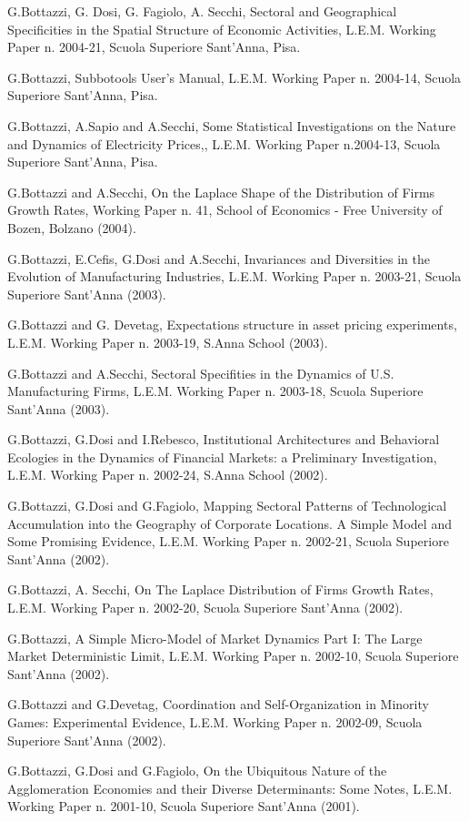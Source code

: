 \documentclass[a4paper]{article}
\begin{document}
G.Bottazzi, G. Dosi, G. Fagiolo, A. Secchi, Sectoral and Geographical
Specificities in the Spatial Structure of Economic Activities,
L.E.M. Working Paper n. 2004-21, Scuola Superiore Sant'Anna, Pisa.

G.Bottazzi, Subbotools User's Manual, L.E.M. Working Paper n.
2004-14, Scuola Superiore Sant'Anna, Pisa.

G.Bottazzi, A.Sapio and A.Secchi, Some Statistical Investigations on
the Nature and Dynamics of Electricity Prices,, L.E.M. Working Paper
n.2004-13, Scuola Superiore Sant'Anna, Pisa.

G.Bottazzi and A.Secchi, On the Laplace Shape of the
Distribution of Firms Growth Rates, Working Paper n. 41, School of
Economics - Free University of Bozen, Bolzano (2004).

G.Bottazzi, E.Cefis, G.Dosi and A.Secchi, Invariances and
Diversities in the Evolution of Manufacturing Industries, L.E.M.
Working Paper n. 2003-21, Scuola Superiore Sant'Anna (2003).

G.Bottazzi and G. Devetag, Expectations structure in asset
pricing experiments, L.E.M. Working Paper n. 2003-19, S.Anna
School (2003).

G.Bottazzi and A.Secchi, Sectoral Specifities in the
Dynamics of U.S. Manufacturing Firms, L.E.M. Working Paper n.
2003-18, Scuola Superiore Sant'Anna (2003).

G.Bottazzi, G.Dosi and I.Rebesco, Institutional Architectures
and Behavioral Ecologies in the Dynamics of Financial Markets: a
Preliminary Investigation, L.E.M. Working Paper n. 2002-24, S.Anna
School (2002).

G.Bottazzi, G.Dosi and G.Fagiolo, Mapping Sectoral Patterns
of Technological Accumulation into the Geography of Corporate
Locations. A Simple Model and Some Promising Evidence, L.E.M.
Working Paper n. 2002-21, Scuola Superiore Sant'Anna (2002).

G.Bottazzi, A. Secchi, On The Laplace Distribution of Firms Growth
Rates, L.E.M. Working Paper n. 2002-20, Scuola Superiore Sant'Anna
(2002).

G.Bottazzi, A Simple Micro-Model of Market Dynamics Part I:
The Large Market Deterministic Limit, L.E.M. Working Paper n.
2002-10, Scuola Superiore Sant'Anna (2002).

G.Bottazzi and G.Devetag, Coordination and Self-Organization
in Minority Games: Experimental Evidence, L.E.M. Working Paper n.
2002-09, Scuola Superiore Sant'Anna (2002).

G.Bottazzi, G.Dosi and G.Fagiolo, On the Ubiquitous Nature of the
Agglomeration Economies and their Diverse Determinants: Some Notes,
L.E.M. Working Paper n. 2001-10, Scuola Superiore Sant'Anna (2001).
\end{document}

